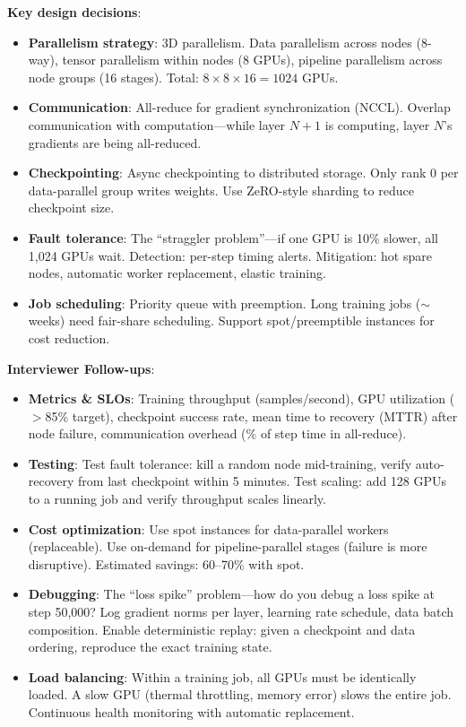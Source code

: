 \textbf{Key design decisions}:
\begin{itemize}[leftmargin=*]
    \item \textbf{Parallelism strategy}: 3D parallelism. Data parallelism across nodes (8-way), tensor parallelism within nodes (8 GPUs), pipeline parallelism across node groups (16 stages). Total: $8 \times 8 \times 16 = 1024$ GPUs.
    \item \textbf{Communication}: All-reduce for gradient synchronization (NCCL). Overlap communication with computation---while layer $N+1$ is computing, layer $N$'s gradients are being all-reduced.
    \item \textbf{Checkpointing}: Async checkpointing to distributed storage. Only rank 0 per data-parallel group writes weights. Use ZeRO-style sharding to reduce checkpoint size.
    \item \textbf{Fault tolerance}: The ``straggler problem''---if one GPU is 10\% slower, all 1,024 GPUs wait. Detection: per-step timing alerts. Mitigation: hot spare nodes, automatic worker replacement, elastic training.
    \item \textbf{Job scheduling}: Priority queue with preemption. Long training jobs ($\sim$weeks) need fair-share scheduling. Support spot/preemptible instances for cost reduction.
\end{itemize}

\textbf{Interviewer Follow-ups}:
\begin{itemize}[leftmargin=*]
    \item \textbf{Metrics \& SLOs}: Training throughput (samples/second), GPU utilization ($>$85\% target), checkpoint success rate, mean time to recovery (MTTR) after node failure, communication overhead (\% of step time in all-reduce).
    \item \textbf{Testing}: Test fault tolerance: kill a random node mid-training, verify auto-recovery from last checkpoint within 5 minutes. Test scaling: add 128 GPUs to a running job and verify throughput scales linearly.
    \item \textbf{Cost optimization}: Use spot instances for data-parallel workers (replaceable). Use on-demand for pipeline-parallel stages (failure is more disruptive). Estimated savings: 60--70\% with spot.
    \item \textbf{Debugging}: The ``loss spike'' problem---how do you debug a loss spike at step 50,000? Log gradient norms per layer, learning rate schedule, data batch composition. Enable deterministic replay: given a checkpoint and data ordering, reproduce the exact training state.
    \item \textbf{Load balancing}: Within a training job, all GPUs must be identically loaded. A slow GPU (thermal throttling, memory error) slows the entire job. Continuous health monitoring with automatic replacement.
\end{itemize}

